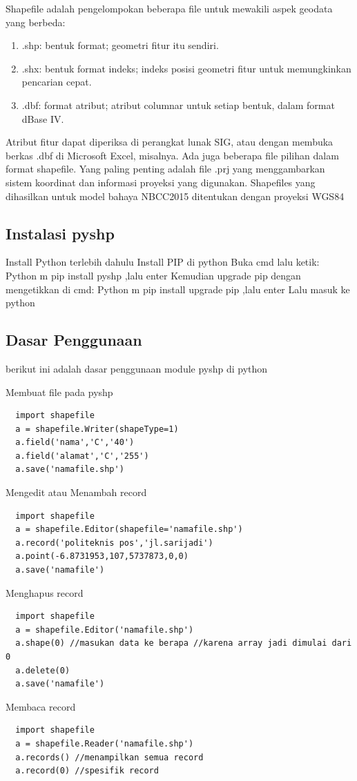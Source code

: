 Shapefile adalah pengelompokan beberapa file untuk mewakili aspek geodata yang berbeda:
\begin{enumerate}
	\item .shp: bentuk format; geometri fitur itu sendiri.
	\item .shx: bentuk format indeks; indeks posisi geometri fitur untuk memungkinkan pencarian cepat.
	\item .dbf: format atribut; atribut columnar untuk setiap bentuk, dalam format dBase IV.
\end{enumerate}
Atribut fitur dapat diperiksa di perangkat lunak SIG, atau dengan membuka berkas .dbf di Microsoft Excel, misalnya. Ada juga beberapa file pilihan dalam format shapefile. Yang paling penting adalah file .prj yang menggambarkan sistem koordinat dan informasi proyeksi yang digunakan. Shapefiles yang dihasilkan untuk model bahaya NBCC2015 ditentukan dengan proyeksi WGS84

\subsection{Instalasi pyshp}
Install Python terlebih dahulu
Install PIP di python
Buka cmd lalu ketik: Python m pip install pyshp ,lalu enter
Kemudian upgrade pip dengan mengetikkan di cmd: Python m pip install upgrade pip ,lalu enter
Lalu masuk ke python

\subsection{Dasar Penggunaan}
berikut ini adalah dasar penggunaan module pyshp di python

Membuat file pada pyshp
  \begin{verbatim}
  import shapefile
  a = shapefile.Writer(shapeType=1)
  a.field('nama','C','40')
  a.field('alamat','C','255')
  a.save('namafile.shp')
  \end{verbatim}

Mengedit atau Menambah record
\begin{verbatim}
  import shapefile
  a = shapefile.Editor(shapefile='namafile.shp')
  a.record('politeknis pos','jl.sarijadi')
  a.point(-6.8731953,107,5737873,0,0)
  a.save('namafile')
\end{verbatim}

Menghapus record
\begin{verbatim}
  import shapefile
  a = shapefile.Editor('namafile.shp')
  a.shape(0) //masukan data ke berapa //karena array jadi dimulai dari 0
  a.delete(0)
  a.save('namafile')
\end{verbatim}

Membaca record
\begin{verbatim}
  import shapefile
  a = shapefile.Reader('namafile.shp')
  a.records() //menampilkan semua record
  a.record(0) //spesifik record
\end{verbatim}






